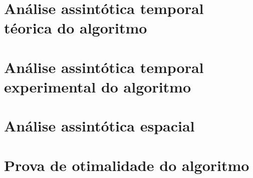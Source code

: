 \documentclass{scrartcl}
\begin{document}
\section*{Análise assintótica temporal téorica do algoritmo}

\section*{Análise assintótica temporal experimental do algoritmo}

\section*{Análise assintótica espacial}

\section*{Prova de otimalidade do algoritmo}


\end{document}
